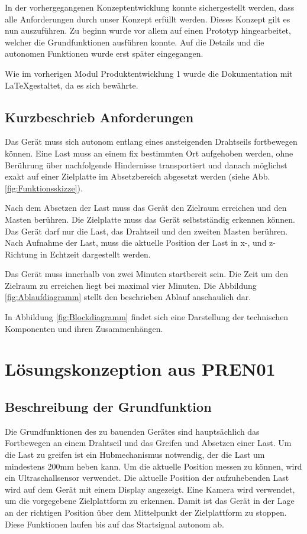 \documentclass[a4paper]{report}
\begin{document}
In der vorhergegangenen Konzeptentwicklung konnte sichergestellt werden, dass alle Anforderungen durch unser Konzept erfüllt werden. Dieses Konzept gilt es nun auszuführen. Zu beginn wurde vor allem auf einen Prototyp hingearbeitet, welcher die Grundfunktionen ausführen konnte. Auf die Details und die autonomen Funktionen wurde erst später eingegangen. 

Wie im vorherigen Modul Produktentwicklung 1 wurde die Dokumentation mit \LaTeX gestaltet, da es sich bewährte.

\section{Kurzbeschrieb Anforderungen}
\label{sec:KurzAnforder}
Das Gerät muss sich autonom entlang eines ansteigenden Drahtseils fortbewegen können. Eine Last muss an einem fix bestimmten Ort aufgehoben werden, ohne Berührung über nachfolgende Hindernisse transportiert und danach möglichst exakt auf einer Zielplatte im Absetzbereich abgesetzt werden (siehe Abb.\ref{fig:Funktionsskizze}).

Nach dem Absetzen der Last muss das Gerät den Zielraum erreichen und den Masten berühren. Die Zielplatte muss das Gerät selbstständig erkennen können. Das Gerät darf nur die Last, das Drahtseil und den zweiten Masten berühren. Nach Aufnahme der Last, muss die aktuelle Position der Last in x-, und z-Richtung in Echtzeit dargestellt werden.

Das Gerät muss innerhalb von zwei Minuten startbereit sein. Die Zeit um den Zielraum zu erreichen liegt bei maximal vier Minuten. Die Abbildung \ref{fig:Ablaufdiagramm} stellt den beschrieben Ablauf anschaulich dar.

In Abbildung \ref{fig:Blockdiagramm} findet sich eine Darstellung der technischen Komponenten und ihren Zusammenhängen.

\chapter{Lösungskonzeption aus PREN01}
\label{ch:Loesungskonzept}

\section{Beschreibung der Grundfunktion}
\label{sec:GrundBeschrieb}
Die Grundfunktionen des zu bauenden Gerätes sind hauptsächlich das Fortbewegen an einem Drahtseil und das Greifen und Absetzen einer Last. Um die Last zu greifen ist ein Hubmechanismus notwendig, der die Last um mindestens 200mm heben kann. Um die aktuelle Position messen zu können, wird ein Ultraschallsensor verwendet. Die aktuelle Position der aufzuhebenden Last wird auf dem Gerät mit einem Display angezeigt. Eine Kamera wird verwendet, um die vorgegebene Zielplattform zu erkennen. Damit ist das Gerät in der Lage an der richtigen Position über dem Mittelpunkt der Zielplattform zu stoppen. Diese Funktionen laufen bis auf das Startsignal autonom ab.
\end{document}
